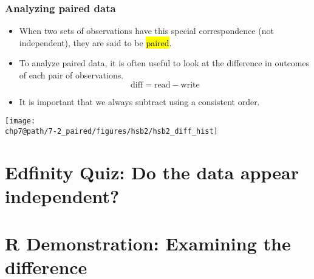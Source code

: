 \documentclass[slidestop,compress,mathserif]{beamer}
\makeatletter
\def\chp7@path{../../Chp 7}
\makeatother
\begin{document}
\begin{frame}
\frametitle{Analyzing paired data}

\begin{itemize}

\item When two sets of observations have this special correspondence (not independent), they are said to be \hl{paired}.

\pause

\item To analyze paired data, it is often useful to look at the difference in outcomes of each pair of observations. 
\[ \text{diff} = \text{read} - \text{write} \]

\pause

\item It is important that we always subtract using a consistent order.

\end{itemize}

{
\texttt{[image: \\chp7@path/7-2\_paired/figures/hsb2/hsb2\_diff\_hist]}
}

\end{frame}


\section{Edfinity Quiz: Do the data appear independent?}


\section{R Demonstration: Examining the difference}  %
\end{document}
